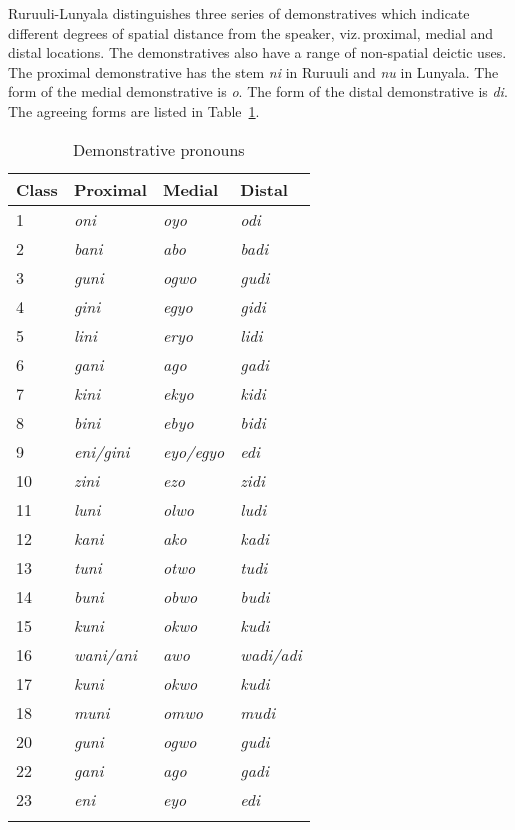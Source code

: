 Ruruuli-Lunyala distinguishes three series of demonstratives which indicate different degrees of spatial distance from the speaker, viz.\,proximal, medial and distal locations. 
The demonstratives also have a range of non-spatial deictic uses. 
The proximal demonstrative has the stem \textit{ni} in Ruruuli and \textit{nu} in Lunyala. 
The form of the medial demonstrative is \textit{o}. 
The form of the distal demonstrative is \textit{di}. 
The agreeing forms are listed in Table~\ref{tab-demonstratives}. 

\begin{table}[!h]
\caption{Demonstrative pronouns}
\begin{tabular}{l l l l}
\lsptoprule
Class & Proximal & Medial & Distal\\
\midrule
1 & \textit{oni} & \textit{oyo} & \textit{odi}\\
2 & \textit{bani} & \textit{abo} & \textit{badi}\\
3 & \textit{guni} & \textit{ogwo} & \textit{gudi}\\
4 & \textit{gini} & \textit{egyo} & \textit{gidi}\\
5 & \textit{lini} & \textit{eryo} & \textit{lidi}\\
6 & \textit{gani} & \textit{ago} & \textit{gadi}\\
7 & \textit{kini} & \textit{ekyo} & \textit{kidi}\\
8 & \textit{bini} & \textit{ebyo} & \textit{bidi}\\
9 & \textit{eni/gini} & \textit{eyo/egyo} & \textit{edi}\\
10 & \textit{zini} & \textit{ezo} & \textit{zidi}\\
11 & \textit{luni} & \textit{olwo} & \textit{ludi}\\
12 & \textit{kani} & \textit{ako} & \textit{kadi}\\
13 & \textit{tuni} & \textit{otwo} & \textit{tudi}\\
14 & \textit{buni} & \textit{obwo} & \textit{budi}\\
15 & \textit{kuni} & \textit{okwo} & \textit{kudi}\\
16 & \textit{wani/ani} & \textit{awo} & \textit{wadi/adi}\\
17 & \textit{kuni} & \textit{okwo} & \textit{kudi}\\
18 & \textit{muni} & \textit{omwo} & \textit{mudi}\\
20 & \textit{guni} & \textit{ogwo} & \textit{gudi}\\
22 & \textit{gani} & \textit{ago} & \textit{gadi}\\
23 & \textit{eni} & \textit{eyo} & \textit{edi}\\
\lspbottomrule
\end{tabular}
\label{tab-demonstratives}
\end{table}


